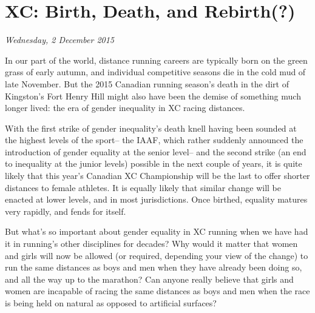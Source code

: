 \chapter{XC: Birth, Death, and Rebirth(?)}
\textit{Wednesday, 2 December 2015}
\bigskip

In our part of the world, distance running careers are typically born on the green grass of early autumn, and individual competitive seasons die in the cold mud of late November. But the 2015 Canadian running season's death in the dirt of Kingston's Fort Henry Hill might also have been the demise of something much longer lived: the era of gender inequality in XC racing distances.

With the first strike of gender inequality's death knell having been sounded at the highest levels of the sport-- the IAAF, which rather suddenly announced the introduction of gender equality at the senior level-- and the second strike (an end to inequality at the junior levels) possible in the next couple of years, it is quite likely that this year's Canadian XC Championship will be the last to offer shorter distances to female athletes. It is equally likely that similar change will be enacted at lower levels, and in most jurisdictions. Once birthed, equality matures very rapidly, and fends for itself.

But what's so important about gender equality in XC running when we have had it in running's other disciplines for decades? Why would it matter that women and girls will now be allowed (or required, depending your view of the change) to run the same distances as boys and men when they have already been doing so, and all the way up to the marathon? Can anyone really believe that girls and women are incapable of racing the same distances as boys and men when the race is being held on natural as opposed to artificial surfaces?

